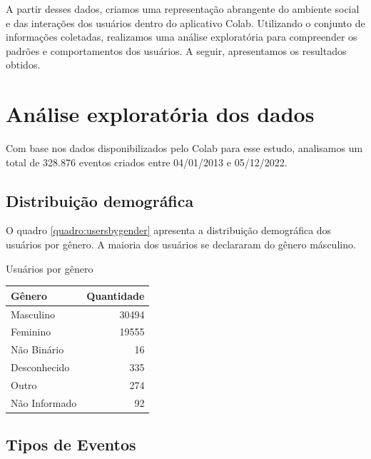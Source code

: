 A partir desses dados, criamos uma representação abrangente do ambiente social e das interações dos usuários dentro do aplicativo Colab. Utilizando o conjunto de informações coletadas, realizamos uma análise exploratória para compreender os padrões e comportamentos dos usuários. A seguir, apresentamos os resultados obtidos.

\section{Análise exploratória dos dados}
\label{sec:colab_data_analysis}

Com base nos dados disponibilizados pelo Colab para esse estudo, analisamos um total de 328.876 eventos criados entre 04/01/2013 e 05/12/2022.

\subsection*{Distribuição demográfica}

O quadro \autoref{quadro:usersbygender} apresenta a distribuição demográfica dos usuários por gênero. A maioria dos usuários se declararam do gênero másculino.

\begin{quadro}[htb]
	\caption{Usuários por gênero}
	\label{quadro:usersbygender}
	\centering
	\begin{tabular}{|l|r|}
		\hline
		\textbf{Gênero} & \textbf{Quantidade} \\
		\hline
		Masculino       & 30494               \\
		Feminino        & 19555               \\
		Não Binário     & 16                  \\
		Desconhecido    & 335                 \\
		Outro           & 274                 \\
		Não Informado   & 92                  \\
		\hline
	\end{tabular}
\end{quadro}

\subsection*{Tipos de Eventos}

